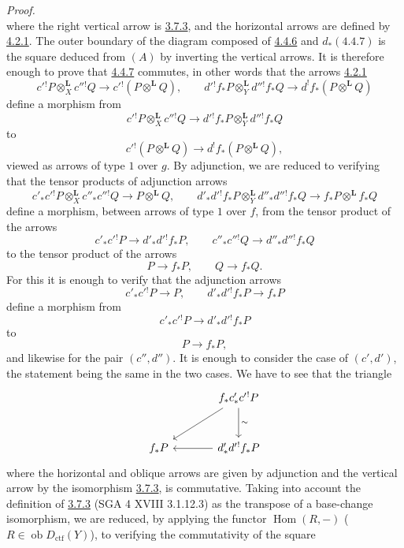 \documentclass[11pt]{article}
\newenvironment{prooftext}[1][Proof]{\par\noindent\emph{#1.}\ }{\par\medskip}
\DeclareMathOperator{\Hom}{Hom}
\newcommand{\ob}{\operatorname{ob}}
\providecommand{\Dctf}{D_{\mathrm{ctf}}}
\providecommand{\Dctf}{D_{\mathrm{ctf}}}
\providecommand{\Hom}{\operatorname{Hom}}
\providecommand{\ob}{\operatorname{ob}}
\providecommand{\Hom}{\operatorname{Hom}}
\begin{document}
\begin{prooftext}[Proof]
\begin{equation}
\end{equation}
where the right vertical arrow is \hyperref[sga5:III:equation:3.7.3]{3.7.3}, and the horizontal arrows are defined by \hyperref[sga5:III:equation:4.2.1]{4.2.1}. The outer boundary of the diagram composed of \hyperref[sga5:III:equation:4.4.6]{4.4.6} and $d_*(\hyperref[sga5:III:equation:4.4.7]{4.4.7})$ is the square deduced from $(A)$ by inverting the vertical arrows. It is therefore enough to prove that \hyperref[sga5:III:equation:4.4.7]{4.4.7} commutes, in other words that the arrows \hyperref[sga5:III:equation:4.2.1]{4.2.1}
\[
c'{}^!P\otimes_X^{\mathbf L}c''{}^!Q\longrightarrow c'{}^!(P\otimes^{\mathbf L}Q),\qquad
d'{}^!f_*P\otimes_Y^{\mathbf L}d''{}^!f_*Q\longrightarrow d^!f_*(P\otimes^{\mathbf L}Q)
\]
define a morphism from
\[
c'{}^!P\otimes_X^{\mathbf L}c''{}^!Q\longrightarrow d'{}^!f_*P\otimes_Y^{\mathbf L}d''{}^!f_*Q
\]
to
\[
c'{}^!(P\otimes^{\mathbf L}Q)\longrightarrow d^!f_*(P\otimes^{\mathbf L}Q),
\]
viewed as arrows of type $1$ over $g$. By adjunction, we are reduced to verifying that the tensor products of adjunction arrows
\[
c'_*c'{}^!P\otimes_X^{\mathbf L}c''_*c''{}^!Q\longrightarrow P\otimes^{\mathbf L}Q,
\qquad
d'_*d'{}^!f_*P\otimes_Y^{\mathbf L}d''_*d''{}^!f_*Q
\longrightarrow f_*P\otimes^{\mathbf L}f_*Q
\]
define a morphism, between arrows of type $1$ over $f$, from the tensor product of the arrows
\[
c'_*c'{}^!P\longrightarrow d'_*d'{}^!f_*P,\qquad
c''_*c''{}^!Q\longrightarrow d''_*d''{}^!f_*Q
\]
to the tensor product of the arrows
\[
P\longrightarrow f_*P,\qquad Q\longrightarrow f_*Q.
\]
For this it is enough to verify that the adjunction arrows
\[
c'_*c'{}^!P\longrightarrow P,\qquad d'_*d'{}^!f_*P\longrightarrow f_*P
\]
define a morphism from
\[
c'_*c'{}^!P\longrightarrow d'_*d'{}^!f_*P
\]
to
\[
P\longrightarrow f_*P,
\]
and likewise for the pair $(c'',d'')$. It is enough to consider the case of $(c',d')$, the statement being the same in the two cases. We have to see that the triangle
\[
\begin{tikzcd}[column sep=large,row sep=large]
& f_*c'_*c'{}^!P \arrow[d,"\sim"]\arrow[dl]\\
f_*P & d'_*d'{}^!f_*P\arrow[l]
\end{tikzcd}
\]
where the horizontal and oblique arrows are given by adjunction and the vertical arrow by the isomorphism \hyperref[sga5:III:equation:3.7.3]{3.7.3}, is commutative. Taking into account the definition of \hyperref[sga5:III:equation:3.7.3]{3.7.3} (SGA 4 XVIII 3.1.12.3) as the transpose of a base-change isomorphism, we are reduced, by applying the functor $\Hom(R,-)$ ($R\in\ob\Dctf(Y)$), to verifying the commutativity of the square

\end{prooftext}
\end{document}
